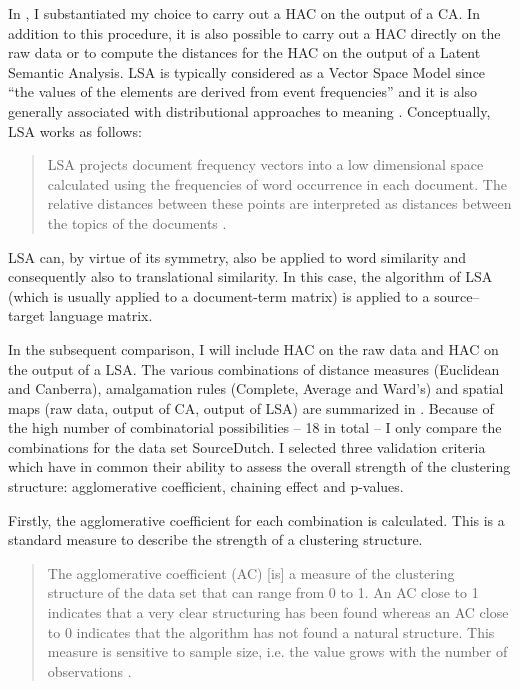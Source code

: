 In , I substantiated my choice to carry out a HAC on the output of a CA. In addition to this procedure, it is also possible to carry out a HAC directly on the raw data or to compute the distances for the HAC on the output of a Latent Semantic Analysis. LSA is typically considered as a Vector Space Model since “the values of the elements are derived from event frequencies” \citep[144]{turney_frequency_2010} and it is also generally associated with distributional approaches to meaning \citep[141]{turney_frequency_2010}. Conceptually, LSA works as follows:

\begin{quote}
LSA projects document frequency vectors into a low dimensional space calculated using the frequencies of word occurrence in each document. The relative distances between these points are interpreted as distances between the topics of the documents \citep[123]{mehler_models_2007}.
\end{quote}

LSA can, by virtue of its symmetry, also be applied to word similarity \citep[123]{mehler_models_2007} and consequently also to translational similarity. In this case, the algorithm of LSA (which is usually applied to a document-term matrix) is applied to a source–target language matrix.

In the subsequent comparison, I will include HAC on the raw data and HAC on the output of a LSA. The various combinations of distance measures (Euclidean and Canberra), amalgamation rules (Complete, Average and Ward’s) and spatial maps (raw data, output of CA, output of LSA) are summarized in . Because of the high number of combinatorial possibilities – 18 in total – I only compare the combinations for the data set SourceDutch. I selected three validation criteria which have in common their ability to assess the overall strength of the clustering structure: agglomerative coefficient, chaining effect and p-values.

Firstly, the agglomerative coefficient for each combination is calculated. This is a standard measure to describe the strength of a clustering structure.

\begin{quote}
The agglomerative coefficient (AC) [is] a measure of the clustering structure of the data set that can range from 0 to 1. An AC close to 1 indicates that a very clear structuring has been found whereas an AC close to 0 indicates that the algorithm has not found a natural structure. This measure is sensitive to sample size, i.e. the value grows with the number of observations \citep[426]{glynn_cluster_2014}.
\end{quote}

